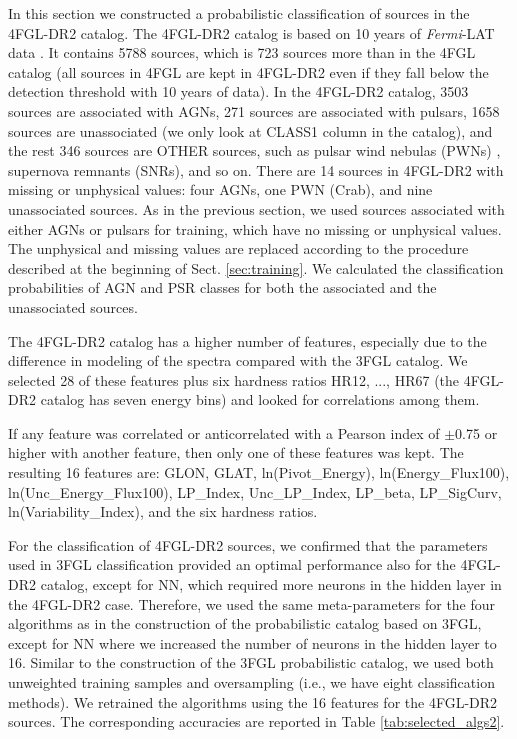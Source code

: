 \documentclass[referee]{aa} %
\newcommand{\Fermi}{\textit{Fermi}\xspace}
\begin{document}
In this section we constructed a probabilistic classification of sources in the 4FGL-DR2 catalog. The 4FGL-DR2 catalog \citep{2020arXiv200511208B} 
is based on 10 years of \Fermi-LAT data \citep[compared to 8 years of data in the 4FGL catalog,][]{2020ApJS..247...33A}.
It contains 5788 sources, which is 723 sources more than in the 4FGL catalog (all sources in 4FGL are kept in 4FGL-DR2 even if they fall
below the detection threshold with 10 years of data). 
In the 4FGL-DR2 catalog,
3503 sources are associated with AGNs,
271 sources are associated with pulsars,
1658 sources are unassociated (we only look at CLASS1 column in the catalog), 
and the rest 346 sources are OTHER sources, such as pulsar wind nebulas (PWNs)%
, supernova remnants (SNRs), and so on.
There are 14 sources in 4FGL-DR2 with missing or unphysical values: four AGNs, one PWN (Crab), and nine unassociated sources.
As in the previous section, we used sources associated with either AGNs or pulsars for training,
which have no missing or unphysical values.
The unphysical and missing values are replaced according to the procedure described at the beginning of Sect. \ref{sec:training}.
We calculated the classification probabilities of AGN and PSR classes for both the associated and the unassociated sources.

The 4FGL-DR2 catalog has a higher number of features, especially due to the difference in modeling of the spectra compared with the 3FGL catalog. 
We selected 28 of these features plus six hardness ratios HR12, ..., HR67 (the 4FGL-DR2 catalog has seven energy bins)
and looked for correlations among them. 

If any feature was correlated or anticorrelated with a Pearson index of $\pm$0.75 or higher with another feature, then only one of these features was kept. 
The resulting 16 features are:
GLON, GLAT, ln(Pivot\_Energy), ln(Energy\_Flux100), ln(Unc\_Energy\_Flux100), LP\_Index, Unc\_LP\_Index, LP\_beta, LP\_SigCurv, ln(Variability\_Index), and the six hardness ratios.

For the classification of 4FGL-DR2 sources, we confirmed that the parameters used in 3FGL classification provided an optimal performance also for the 4FGL-DR2 catalog, except for NN, which required more neurons in the hidden layer in the 4FGL-DR2 case.
Therefore, we used the same meta-parameters for the four algorithms as in the construction of the probabilistic catalog based on 3FGL, except for NN where we increased the number of neurons in the hidden layer to 16. Similar to the construction of the 3FGL probabilistic catalog, we used both unweighted training samples and oversampling (i.e., we have eight classification methods).
We retrained the algorithms using the 16 features for the 4FGL-DR2 sources.
The corresponding accuracies are reported in Table \ref{tab:selected_algs2}.
\end{document}
